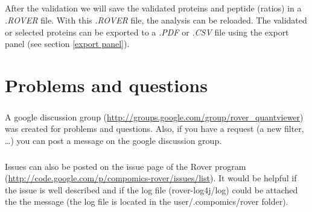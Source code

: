 \documentclass[11pt,a4paper,oneside,notitlepage]{book}
\begin{document}
\paragraph{}After the validation we will save the validated proteins and peptide (ratios) in a \textit{.ROVER} file. With this \textit{.ROVER} file, the analysis can be reloaded. The validated or selected proteins can be exported to a \textit{.PDF} or \textit{.CSV} file using the export panel (see section \ref{export panel}).

\chapter{Problems and questions}

\paragraph{}A google discussion group (\url{http://groups.google.com/group/rover_quantviewer}) was created for problems and questions. Also, if you have a request (a new filter, \ldots) you can post a message on the google discussion group.
\paragraph{}Issues can also be posted on the issue page of the Rover program (\url{http://code.google.com/p/compomics-rover/issues/list}). It would be helpful if the issue is well described and if the log file (rover-log4j/log) could be attached the the message (the log file is located in the user/.compomics/rover folder).

\backmatter
\end{document}
